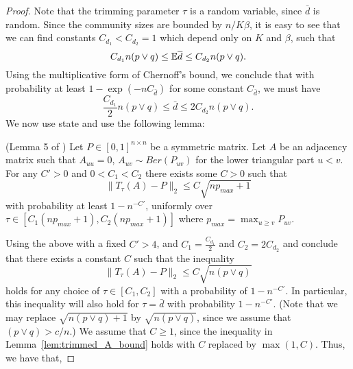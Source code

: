 \documentclass{article}
\begin{document}
\begin{proof}
Note that the trimming parameter $\tau$ is a random variable, since $\bar d$ is random. Since the community sizes are bounded by $n/K\beta$, it is easy to see that we can find constants $C_{d_1} < C_{d_2}= 1$ which depend only on $K$ and $\beta$, such that 
$$C_{d_1}n (p \vee q) \leq  {\mathbb E} \overline{d} \leq C_{d_2} n(p \vee q).$$ 
Using the multiplicative form of Chernoff's bound, we conclude that with probability at least $1 - \exp(-nC_{\bar d})$ for some constant $C_{\bar d}$, we must have
$$\frac{C_{d_1}}{2} n (p \vee q) \leq  \bar d \leq 2C_{d_2} n(p \vee q).$$ 
We now use state and use the following lemma:
\begin{lemma} (Lemma 5 of \cite{gao2015achieving})
\label{lem:trimmed_A_bound}
Let $P \in [0,1]^{n \times n}$ be a symmetric matrix. Let $A$ be an adjacency matrix such that $A_{uu} = 0$, $A_{uv} \sim Ber(P_{uv})$ for the lower triangular part $u < v$. For any $C' > 0$ and $0 < C_1 < C_2$ there exists some $C > 0$ such that
\[
\| T_\tau(A) - P \|_2 \leq C \sqrt{ n p_{max} + 1}
\]
with probability at least $1-n^{-C'}$, uniformly over $\tau \in [C_1 (np_{max} + 1), C_2 (np_{max} + 1)]$ where $p_{max} = \max_{u \geq v} P_{uv}$. 
\end{lemma}

Using the above with a fixed $C' > 4$, and $C_1 = \frac{C_{d_1}}{2}$ and $C_2 = 2C_{d_2}$ and conclude that there exists a constant $C$ such that the inequality 
\begin{equation*}
\| T_{\tau}(A) - P \|_2 \leq C \sqrt{ n (p \vee q) }
\end{equation*}
holds for any choice of $\tau \in [C_1, C_2]$ with a probability of $1 - n^{-C'}$. In particular, this inequality will also hold for $\tau = \bar d$ with probability $1-n^{-C'}$. (Note that we may replace $\sqrt{n(p \vee q) + 1}$ by $\sqrt{n(p \vee q)}$, since we assume that $(p \vee q) > c/n$.) We assume that $C \geq 1$, since the inequality in Lemma~\ref{lem:trimmed_A_bound} holds with $C$ replaced by $\max(1,C).$ 
Thus, we have that,


\end{proof}
\end{document}
